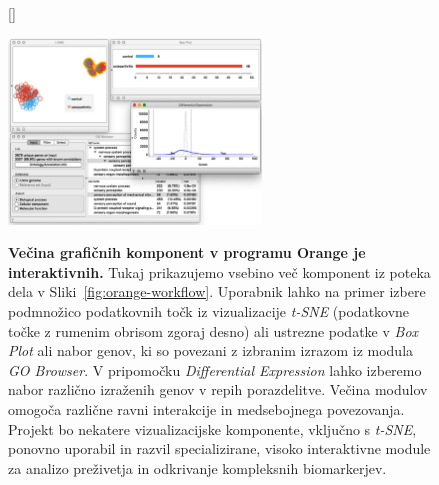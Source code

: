 \documentclass[11pt,a4paper]{article}
\renewcommand{\bold}{\textbf}
\begin{document}
\begin{figure}[htbp]
[\FBwidth]
{\caption{\small\bold{Večina grafičnih komponent v programu Orange je interaktivnih.} Tukaj prikazujemo vsebino več komponent iz poteka dela v Sliki~\ref{fig:orange-workflow}. Uporabnik lahko na primer izbere podmnožico podatkovnih točk iz vizualizacije {\em t-SNE} (podatkovne točke z rumenim obrisom zgoraj desno) ali ustrezne podatke v  {\em Box Plot} ali nabor genov, ki so povezani z izbranim izrazom iz modula  {\em GO Browser}. V pripomočku  {\em Differential Expression} lahko izberemo nabor različno izraženih genov v repih porazdelitve. Večina modulov omogoča različne ravni interakcije in medsebojnega povezovanja. Projekt bo nekatere vizualizacijske komponente, vključno s {\em t-SNE}, ponovno uporabil in razvil specializirane, visoko interaktivne module za analizo preživetja in odkrivanje kompleksnih biomarkerjev.}
\label{fig:orange-interactivity}}
{\includegraphics[width=0.6\textwidth]{orange-interactivity}}
\end{figure}
\end{document}
